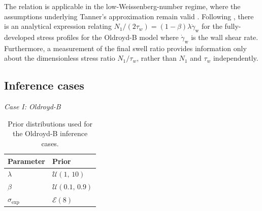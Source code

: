 \documentclass{elsarticle}
\begin{document}
The relation is applicable in the low-Weissenberg-number regime, where the
assumptions underlying Tanner's approximation remain valid \cite{comminal2018numerical}. Following \cite{comminal2018numerical}, there is an analytical expression relating $N_1/(2 \tau_w) = (1-\beta) \lambda \dot{\gamma}_{\text{w}}$ for the fully-developed stress profiles for the Oldroyd-B model where $\dot{\gamma}_{\text{w}}$ is the wall shear rate.  Furthermore, a measurement of
the final swell ratio provides information only about the dimensionless
stress ratio \(N_{1}/\tau_w\), rather than \(N_{1}\) and \(\tau_w\)
independently.

\subsection{Inference cases}

\emph{Case I: Oldroyd-B}


\begin{table}[!ht]
\centering
\begin{tabular}{ll}
\toprule
Parameter & Prior \\
\midrule
${\lambda}$ & $\mathcal{U}(1,\,10)$ \\
$\beta$ & $\mathcal{U}(0.1,\,0.9)$ \\
$\sigma_{\mathrm{exp}}$      & $\mathcal{E}(8)$ \\
\bottomrule
\end{tabular}
\caption{Prior distributions used for the Oldroyd-B inference cases.}
\label{tab:prior_oldoryd}
\end{table}
\end{document}
